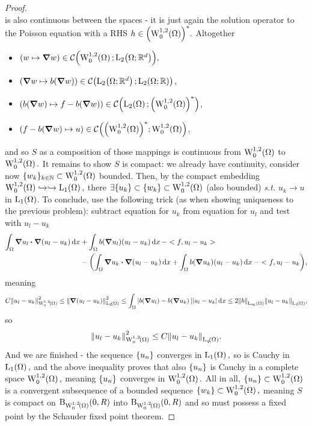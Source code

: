 \documentclass{article}
\begin{document}
\begin{example}
\begin{proof}
\[		\]
		is also continuous between the spaces - it is just again the solution operator to the Poisson equation with a RHS $h \in \qty(\WkpzeroSet[1][2]{\Omega})^{*}.$ Altogether
		\begin{itemize}
			\item $\qty(w \mapsto \grad w) \in \mathcal{C}\qty(\WkpzeroSet[1][2]{\Omega}; \LpSet[2]{\Omega;\R^{d}}),$
			\item $\qty(\grad w \mapsto b(\grad w)) \in \mathcal{C}\qty(\LpSet[2]{\Omega;\R^{d}}; \LpSet[2]{\Omega;\R})$,
			\item $\qty(b\qty(\grad w) \mapsto f - b\qty(\grad w)) \in \mathcal{C}\qty(\LpSet[2]{\Omega}; \qty(\WkpzeroSet[1][2]{\Omega})^{*})$,
			\item $\qty(f - b\qty(\grad w) \mapsto u) \in \mathcal{C}\qty(\qty(\WkpzeroSet[1][2]{\Omega})^{*}; \WkpzeroSet[1][2]{\Omega})$,
		\end{itemize}
		and so $S$ as a composition of those mappings is continuous from $\WkpzeroSet[1][2]{\Omega}$ to $\WkpzeroSet[1][2]{\Omega}.$ It remains to show $S$ is compact: we already have continuity, consider now $\{w_k\}_{k \in \N} \subset \WkpzeroSet[1][2]{\Omega}$ bounded. Then, by the compact embedding $\WkpzeroSet[1][2]{\Omega} \hookrightarrow \hookrightarrow \LpSet[1]{\Omega},$ there $\exists \{u_k\} \subset \qty{w_k} \subset \WkpzeroSet[1][2]{\Omega}$ (also bounded) \textit{s.t.} $u_k \to u$ in $\LpSet[1]{\Omega}$. To conclude, use the following trick (as when showing uniqueness to the previous problem): subtract equation for $u_k$ from equation for $u_l$ and test with $u_l - u_k$
		\begin{align*}
			\int_{\Omega}\grad u_l \vdot \grad\qty(u_l - u_k)\dd{x} &+ \int_{\Omega}b\qty(\grad u_l)\qty(u_l - u_k)\dd{x} - <f, u_l -u_k> \\
										&-\qty(\int_{\Omega}\grad u_k \vdot \grad\qty(u_l - u_k)\dd{x}+ \int_{\Omega}b\qty(\grad u_k)\qty(u_l - u_k)\dd{x} - <f, u_l - u_k),
		\end{align*}
		meaning
		\[
			C \norm{u_l - u_k}_{\WkpzeroSet[1][2]{\Omega}}^{2} \leq	\norm{\grad\qty(u_l - u_k)}_{\LpSet[2]{\Omega}}^{2} \leq \int_{\Omega}|b(\grad u_l) - b\qty(\grad u_k)| |u_l - u_k|\dd{x} \leq 2 \norm{b}_{\LinfSet{\Omega}}\norm{u_l-u_k}_{\LpSet[1]{\Omega}},
		\]
		so 
		\[
			\norm{u_l-u_k}_{\WkpzeroSet[1][2]{\Omega}}^{2} \leq C\norm{u_l-u_k}_{\LpSet[q]{\Omega}}.
		\]
	And we are finished - the sequence $\qty{u_n}$ converges in $\LpSet[1]{\Omega},$ so is Cauchy in $\LpSet[1]{\Omega},$ and the above inequality proves that also $\qty{u_n}$ is Cauchy in a complete space $\WkpzeroSet[1][2]{\Omega},$ meaning $\qty{u_n}$ converges in $\WkpzeroSet[1][2]{\Omega}.$ All in all, $\qty{u_n} \subset \WkpzeroSet[1][2]{\Omega}$ is a convergent subsequence of a bounded sequence $\qty{w_k} \subset \WkpzeroSet[1][2]{\Omega},$ meaning $S$ is compact on $\text{B}_{\WkpzeroSet[1][2]{\Omega}}(0,R)$ into $\text{B}_{\WkpzeroSet[1][2]{\Omega}}(0,R)$ and so must possess a fixed point by the Schauder fixed point theorem.
	\end{proof}
\end{example}
\end{document}
